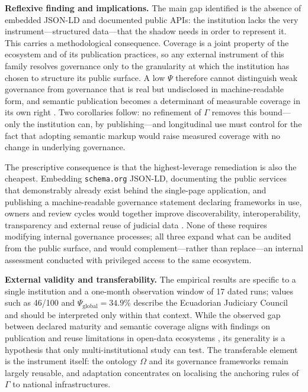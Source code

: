 \documentclass[engproc,proceedingpaper,submit,moreauthors]{Definitions/mdpi}
\begin{document}
\textbf{Reflexive finding and implications.}
    The main gap identified is the absence of embedded JSON-LD and documented public APIs: the institution lacks the very instrument---structured data---that the shadow needs in order to represent it. This carries a methodological consequence. Coverage is a joint property of the ecosystem and of its publication practices, so any external instrument of this family resolves governance only to the granularity at which the institution has chosen to structure its public surface. A low $\Psi$ therefore cannot distinguish weak governance from governance that is real but undisclosed in machine-readable form, and semantic publication becomes a determinant of measurable coverage in its own right \cite{Guha2016}. Two corollaries follow: no refinement of $\Gamma$ removes this bound---only the institution can, by publishing---and longitudinal use must control for the fact that adopting semantic markup would raise measured coverage with no change in underlying governance.

    The prescriptive consequence is that the highest-leverage remediation is also the cheapest. Embedding \texttt{schema.org} JSON-LD, documenting the public services that demonstrably already exist behind the single-page application, and publishing a machine-readable governance statement declaring frameworks in use, owners and review cycles would together improve discoverability, interoperability, transparency and external reuse of judicial data \cite{Guha2016,Attard2015,Wilkinson2016}. None of these requires modifying internal governance processes; all three expand what can be audited from the public surface, and would complement---rather than replace---an internal assessment conducted with privileged access to the same ecosystem.

\textbf{External validity and transferability.}
    The empirical results are specific to a single institution and a one-month observation window of 17 dated runs; values such as 46/100 and $\Psi_{\mathrm{global}}=34.9\%$ describe the Ecuadorian Judiciary Council and should be interpreted only within that context. While the observed gap between declared maturity and semantic coverage aligns with findings on publication and reuse limitations in open-data ecosystems \cite{Janssen2012,Attard2015,Neumaier2016}, its generality is a hypothesis that only multi-institutional study can test. The transferable element is the instrument itself: the ontology $\Omega$ and its governance frameworks remain largely reusable, and adaptation concentrates on localising the anchoring rules of $\Gamma$ to national infrastructures.
\end{document}

